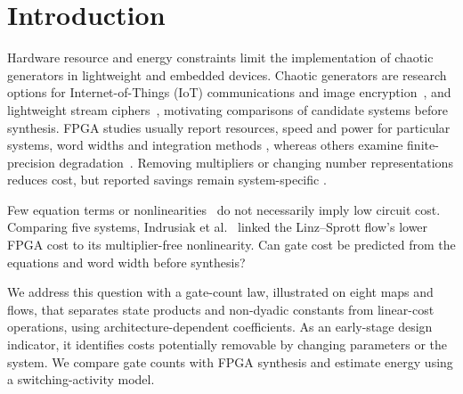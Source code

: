 \documentclass[ASNA,twocolumn]{USG}
\begin{document}
\maketitle

\section{Introduction}\label{sec:intro}
Hardware resource and energy constraints limit the implementation of chaotic
generators in lightweight and embedded devices.
Chaotic generators are research options for Internet-of-Things (IoT) communications
and image encryption~\cite{karagiorgos2024}, and lightweight stream
ciphers~\cite{ding2019}, motivating comparisons of candidate systems before
synthesis. FPGA studies usually report resources, speed and power for particular
systems, word widths and integration methods
\cite{mansingka2013, rezk2020, guillen2021, jauhari2023, damaj2024, babajans2025, alloun2025, tasdemir2025}, whereas others examine
finite-precision degradation~\cite{li2005, mendez2019}. Removing multipliers or changing
number representations reduces cost, but reported savings remain system-specific
\cite{rezk2020, nepomuceno2019, teixeira2019}.

Few equation terms or nonlinearities~\cite{sprott1994} do not necessarily imply low
circuit cost. Comparing five systems, Indrusiak et al.\ \cite{indrusiak2005} linked
the Linz--Sprott flow's lower FPGA cost to its multiplier-free nonlinearity.
Can gate cost be predicted from the equations and word width before synthesis?

We address this question with a gate-count law, illustrated on eight maps and flows,
that separates state products and non-dyadic constants from linear-cost operations,
using architecture-dependent coefficients. As an early-stage design indicator,
it identifies costs potentially removable by changing parameters or the system.
We compare gate counts with FPGA synthesis and estimate energy using a
switching-activity model.

\end{document}
